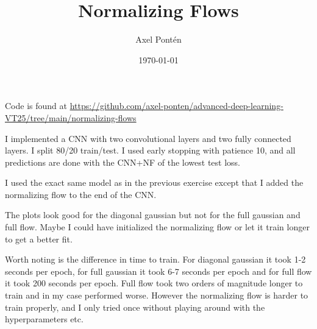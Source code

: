 \documentclass[12pt, a4paper]{article}
\title{Normalizing Flows}
\author{Axel Pontén}
\date{\today}
\begin{document}
\maketitle

Code is found at \url{https://github.com/axel-ponten/advanced-deep-learning-VT25/tree/main/normalizing-flows}

I implemented a CNN with two convolutional layers and two fully connected layers. I split 80/20 train/test. I used early stopping with patience 10, and all predictions are done with the CNN+NF of the lowest test loss.

I used the exact same model as in the previous exercise except that I added the normalizing flow to the end of the CNN.

The plots look good for the diagonal gaussian but not for the full gaussian and full flow. Maybe I could have initialized the normalizing flow or let it train longer to get a better fit.

Worth noting is the difference in time to train. For diagonal gaussian it took 1-2 seconds per epoch, for full gaussian it took 6-7 seconds per epoch and for full flow it took 200 seconds per epoch. Full flow took two orders of magnitude longer to train and in my case performed worse. However the normalizing flow is harder to train properly, and I only tried once without playing around with the hyperparameters etc. 
\end{document}
